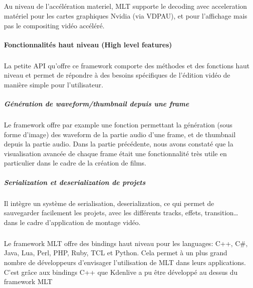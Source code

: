 \subparagraph{}

Au niveau de l'accélération materiel, MLT supporte le
decoding avec acceleration matériel pour les cartes graphiques Nvidia
 (via VDPAU), et pour l'affichage
mais pas le compositing vidéo accéléré.


\paragraph{Fonctionnalités haut niveau (High level features)}

\subparagraph{}

La petite API qu'offre ce framework comporte des méthodes et des
fonctions haut niveau et permet de répondre à des besoins spécifiques
de l'édition vidéo de manière simple pour l'utilisateur.

\subparagraph{Génération de waveform/thumbnail depuis une frame}

\subparagraph{}

Le framework offre par example une fonction permettant la génération
(sous forme d'image) des waveform de la partie audio d'une frame, et
de thumbnail depuis la partie audio.  Dans la partie précédente, nous
avons constaté que la visualisation avancée de chaque frame était une
fonctionnalité très utile en particulier dans le cadre de la création
de films.

\subparagraph{Serialization et deserialization de projets}

\subparagraph{}

Il intègre un système de serialisation, deserialization, ce qui permet
de sauvegarder facilement les projets, avec les différents tracks,
effets, transition\ldots dans le cadre d'application de montage vidéo.

\subparagraph{}

Le framework MLT offre des bindings haut niveau pour les
languages: C++, C\#, Java, Lua, Perl, PHP, Ruby, TCL et Python. Cela
permet à un plus grand nombre de développeurs d'envisager
l'utilisation de MLT dans leurs applications. C'est grâce
aux bindings C++ que Kdenlive a pu être développé au dessus du
framework MLT

